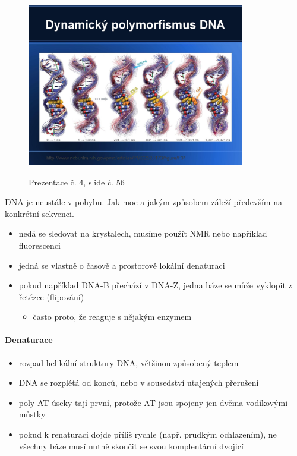 \documentclass[DIV=8]{scrreprt}
\begin{document}
\begin{figure}
    \caption{Prezentace č. 4, slide č. 56}
    \includegraphics[width=0.85\textwidth]{slides-4/slide-56.jpg}
    \centering
    \label{slides-4-slide-56}
\end{figure}

DNA je neustále v pohybu. Jak moc a jakým způsobem záleží především na konkrétní sekvenci.

\begin{itemize}[nosep]
    \item nedá se sledovat na krystalech, musíme použít NMR nebo například fluorescenci
    \item jedná se vlastně o časově a prostorově lokální denaturaci
    \item pokud například DNA-B přechází v DNA-Z, jedna báze se může vyklopit z řetězce (flipování)
\begin{itemize}[nosep]
    \item často proto, že reaguje s nějakým enzymem
\end{itemize}

\end{itemize}



\paragraph{Denaturace}
\begin{itemize}[nosep]
    \item rozpad helikální struktury DNA, většinou způsobený teplem
    \item DNA se rozplétá od konců, nebo v sousedství utajených přerušení
    \item poly-AT úseky tají první, protože AT jsou spojeny jen dvěma vodíkovými můstky
    \item pokud k renaturaci dojde příliš rychle (např. prudkým ochlazením), ne všechny báze musí nutně skončit se svou komplentární dvojicí
\end{itemize}
\end{document}
